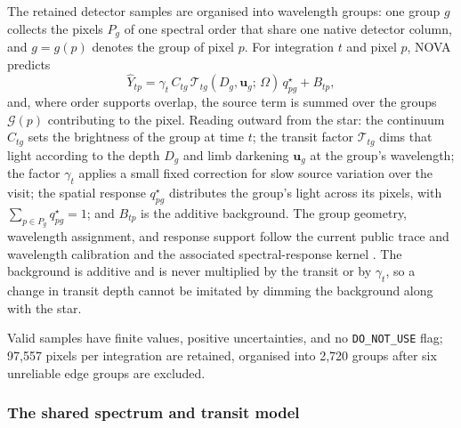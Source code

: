 The retained detector samples are organised into wavelength groups: one
group $g$ collects the pixels $P_g$ of one spectral order that share one
native detector column, and $g=g(p)$ denotes the group of pixel $p$. For
integration $t$ and pixel $p$, NOVA predicts
\begin{equation}
 \widehat Y_{tp}
 = \gamma_t\, C_{tg}\,
   \mathcal{T}_{tg}(D_g, \bm{u}_g;\, \Omega)\,
   q^\star_{pg}
 + B_{tp},
 \label{eq:nova-forward}
\end{equation}
and, where order supports overlap, the source term is summed over the
groups $\mathcal{G}(p)$ contributing to the pixel. Reading outward from
the star: the continuum $C_{tg}$ sets the brightness of the group at time
$t$; the transit factor $\mathcal{T}_{tg}$ dims that light according to
the depth $D_g$ and limb darkening $\bm{u}_g$ at the group's wavelength;
the factor $\gamma_t$ applies a small fixed correction for slow source
variation over the visit; the spatial response $q^\star_{pg}$ distributes
the group's light across its pixels, with
$\sum_{p\in P_g} q^\star_{pg}=1$; and $B_{tp}$ is the additive
background. The group geometry, wavelength assignment, and response
support follow the current public trace and wavelength calibration
\citep{BainesEtAl2023Trace,BainesEtAl2023Wavelength} and the associated
spectral-response kernel
\citep{DarveauBernierEtAl2022,JWSTPipeline2025}. The background is
additive and is never multiplied by the transit or by $\gamma_t$, so a
change in transit depth cannot be imitated by dimming the background
along with the star.

Valid samples have finite values, positive uncertainties, and no
\texttt{DO\_NOT\_USE} flag; 97{,}557 pixels per integration are retained,
organised into 2{,}720 groups after six unreliable edge groups are
excluded.

\subsubsection{The shared spectrum and transit model}


